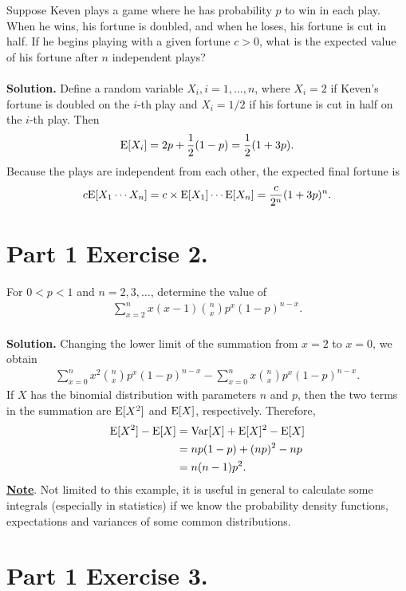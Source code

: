 Suppose Keven plays a game where he has probability $p$ to win in each play. When he wins, his fortune is doubled, and when he loses, his fortune is cut in half. If he begins playing with a given fortune $c > 0$, what is the expected value of his fortune after $n$ independent plays? \\
~\\
\textbf{Solution.} Define a random variable $X_i, i = 1, \ldots, n$, where $X_i = 2$ if Keven's fortune is doubled on the $i$-th play and $X_i = 1/2$ if his fortune is cut in half on the $i$-th play. Then
\begin{align*}
\mathrm{E}[X_i] = 2p + \frac{1}{2}(1-p) = \frac{1}{2}(1 + 3p).
\end{align*}
Because the plays are independent from each other, the expected final fortune is
\begin{align*}
c\mathrm{E}[X_1\cdots X_n] = c\times \mathrm{E}[X_1]\cdots \mathrm{E}[X_n] = \frac{c}{2^n}(1+3p)^n.
\end{align*}


\section*{Part 1 Exercise 2.}

For $0 < p < 1$ and $n = 2, 3, \ldots$, determine the value of
\begin{align*}
\sum_{x=2}^n x(x-1)\binom{n}{x} p^x(1-p)^{n-x}.
\end{align*}
~\\
\textbf{Solution.} Changing the lower limit of the summation from $x = 2$ to $x = 0$, we obtain
\begin{align*}
\sum_{x=0}^n x^2\binom{n}{x} p^x(1-p)^{n-x} - \sum_{x=0}^n x\binom{n}{x} p^x(1-p)^{n-x}.
\end{align*}
If $X$ has the binomial distribution with parameters $n$ and $p$, then the two terms in the summation are $\mathrm{E}[X^2]$ and $\mathrm{E}[X]$, respectively. Therefore,
\begin{align*}
\mathrm{E}[X^2] - \mathrm{E}[X] & = \mathrm{Var}[X] + \mathrm{E}[X]^2 - \mathrm{E}[X] \\
& = np(1-p) + (np)^2 - np \\
& = n(n-1)p^2.
\end{align*}
\underline{\textbf{Note}}. Not limited to this example, it is useful in general to calculate some integrals (especially in statistics) if we know the probability density functions, expectations and variances of some common distributions.

\section*{Part 1 Exercise 3.}

